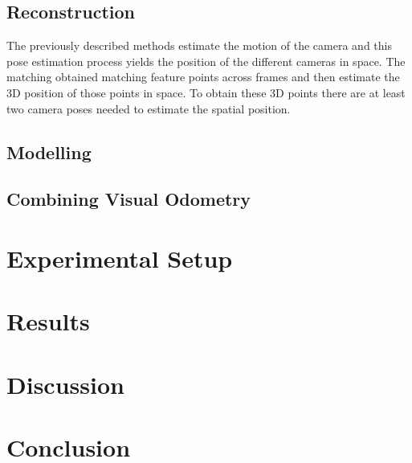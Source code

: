 \documentclass[a4paper]{article}
\begin{document}

\subsection{Reconstruction}
The previously described methods estimate the motion of the camera and this
pose estimation process yields the position of the different cameras in space.
The matching obtained matching feature points across frames and then estimate
the 3D position of those points in space. To obtain these 3D points there are
at least two camera poses needed to estimate the spatial position.

\subsection{Modelling}


\subsection{Combining Visual Odometry}


\section{Experimental Setup}

\section{Results}

\section{Discussion}

\section{Conclusion}



\end{document}
